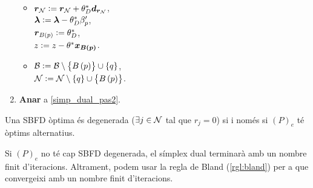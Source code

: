 \begin{alg}
\begin{enumerate}
            \begin{itemize}
                \item $\boldsymbol{r}_{\mathcal{N}} := \boldsymbol{r}_{\mathcal{N}} + \theta_D^* \boldsymbol{d}_{\boldsymbol{r}_{\mathcal{N}}}$, \\
                    $\boldsymbol{\lambda} := \boldsymbol{\lambda} - \theta_D^* \beta_p^\prime$, \\
                    $\boldsymbol{r}_{B\left(p\right)} := \theta_D^*$, \\
                    $z := z - \theta^* \boldsymbol{x_{B\left(p\right)}}$.
                \item $\mathcal{B} := \mathcal{B} \setminus \left\{B\left(p\right)\right\} \cup \left\{q\right\}$, \\
                    $\mathcal{N} := \mathcal{N} \setminus \left\{q\right\} \cup \left\{B\left(p\right)\right\}$.
            \end{itemize}
        \item {\bf Anar} a \ref{simp_dual_pas2}.
    \end{enumerate}
\end{alg}

\begin{prop}
    Una SBFD òptima és degenerada ($\exists j \in \mathcal{N}$ tal que $r_j = 0$) si i només si $\left(P\right)_e$ té òptims alternatius.
\end{prop}

\begin{prop}
    Si $\left(P\right)_e$ no té cap SBFD degenerada, el símplex dual terminarà amb un nombre finit d'iteracions. Altrament, podem usar la regla de Bland (\ref{rgl:bland}) per a que convergeixi amb un nombre finit d'iteracions.
\end{prop}
